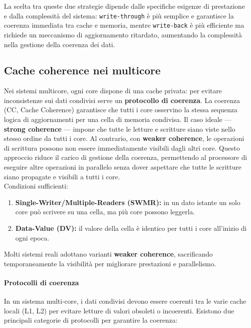 La scelta tra queste due strategie dipende dalle specifiche esigenze di prestazione e dalla complessità del sistema: \texttt{write-through} è più semplice e garantisce la coerenza immediata tra cache e memoria, mentre \texttt{write-back} è più efficiente ma richiede un meccanismo di aggiornamento ritardato, aumentando la complessità nella gestione della coerenza dei dati.


\subsection{Cache coherence nei multicore}
Nei sistemi multicore, ogni core dispone di una cache privata: per evitare inconsistenze sui dati condivisi serve un \textbf{protocollo di coerenza}.  
La coerenza (CC, Cache Coherence) garantisce che tutti i core osservino la stessa sequenza logica di aggiornamenti per una cella di memoria condivisa.  
Il caso ideale — \textbf{strong coherence} — impone che tutte le letture e scritture siano viste nello stesso ordine da tutti i core. Al contrario, con \textbf{weaker coherence}, le operazioni di scrittura possono non essere immediatamente visibili dagli altri core. Questo approccio riduce il carico di gestione della coerenza, permettendo al processore di eseguire altre operazioni in parallelo senza dover aspettare che tutte le scritture siano propagate e visibili a tutti i core.\\
 
Condizioni sufficienti:
\begin{enumerate}
  \item \textbf{Single-Writer/Multiple-Readers (SWMR):} in un dato istante un solo core può scrivere su una cella, ma più core possono leggerla.
  \item \textbf{Data-Value (DV):} il valore della cella è identico per tutti i core all’inizio di ogni epoca.
\end{enumerate}
Molti sistemi reali adottano varianti \textbf{weaker coherence}, sacrificando temporaneamente la visibilità per migliorare prestazioni e parallelismo.

\paragraph{Protocolli di coerenza}
In un sistema multi-core, i dati condivisi devono essere coerenti tra le varie cache locali (L1, L2) per evitare letture di valori obsoleti o incoerenti.  
Esistono due principali categorie di protocolli per garantire la coerenza:

